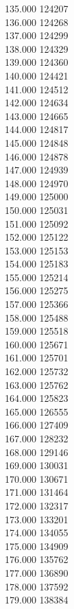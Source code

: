{ 135.000	124207 \\
 136.000	124268 \\
 137.000	124299 \\
 138.000	124329 \\
 139.000	124360 \\
 140.000	124421 \\
 141.000	124512 \\
 142.000	124634 \\
 143.000	124665 \\
 144.000	124817 \\
 145.000	124848 \\
 146.000	124878 \\
 147.000	124939 \\
 148.000	124970 \\
 149.000	125000 \\
 150.000	125031 \\
 151.000	125092 \\
 152.000	125122 \\
 153.000	125153 \\
 154.000	125183 \\
 155.000	125214 \\
 156.000	125275 \\
 157.000	125366 \\
 158.000	125488 \\
 159.000	125518 \\
 160.000	125671 \\
 161.000	125701 \\
 162.000	125732 \\
 163.000	125762 \\
 164.000	125823 \\
 165.000	126555 \\
 166.000	127409 \\
 167.000	128232 \\
 168.000	129146 \\
 169.000	130031 \\
 170.000	130671 \\
 171.000	131464 \\
 172.000	132317 \\
 173.000	133201 \\
 174.000	134055 \\
 175.000	134909 \\
 176.000	135762 \\
 177.000	136890 \\
 178.000	137592 \\
 179.000	138384 \\
}
